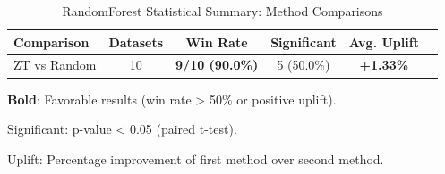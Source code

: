 \begin{table}[htbp]
\centering
\caption{RandomForest Statistical Summary: Method Comparisons}
\label{tab:randomforest_stats_summary}
\begin{tabular}{lccccc}
\toprule
Comparison & Datasets & Win Rate & Significant & Avg. Uplift \\
\midrule
ZT vs Random & 10 & \textbf{9/10 (90.0\%)} & 5 (50.0\%) & \textbf{+1.33\%} \\
\bottomrule
\end{tabular}
\begin{tablenotes}
\small
\item \textbf{Bold}: Favorable results (win rate > 50\% or positive uplift).
\item Significant: p-value < 0.05 (paired t-test).
\item Uplift: Percentage improvement of first method over second method.
\end{tablenotes}
\end{table}